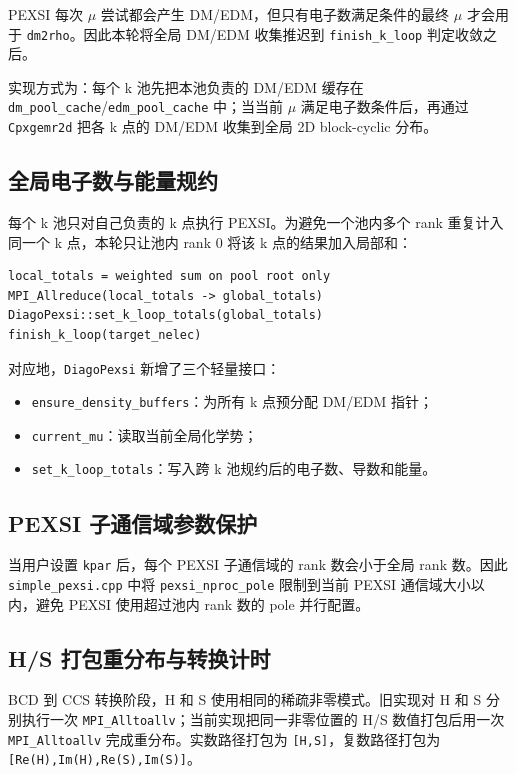 \documentclass[a4paper,11pt]{article}
\newcommand{\code}[1]{\texttt{#1}}
\begin{document}
PEXSI 每次 \(\mu\) 尝试都会产生 DM/EDM，但只有电子数满足条件的最终 \(\mu\) 才会用于 \code{dm2rho}。因此本轮将全局 DM/EDM 收集推迟到 \code{finish\_k\_loop} 判定收敛之后。

实现方式为：每个 k 池先把本池负责的 DM/EDM 缓存在 \code{dm\_pool\_cache}/\code{edm\_pool\_cache} 中；当当前 \(\mu\) 满足电子数条件后，再通过 \code{Cpxgemr2d} 把各 k 点的 DM/EDM 收集到全局 2D block-cyclic 分布。

\subsection{全局电子数与能量规约}

每个 k 池只对自己负责的 k 点执行 PEXSI。为避免一个池内多个 rank 重复计入同一个 k 点，本轮只让池内 rank 0 将该 k 点的结果加入局部和：

\begin{verbatim}
local_totals = weighted sum on pool root only
MPI_Allreduce(local_totals -> global_totals)
DiagoPexsi::set_k_loop_totals(global_totals)
finish_k_loop(target_nelec)
\end{verbatim}

对应地，\code{DiagoPexsi} 新增了三个轻量接口：

\begin{itemize}
    \item \code{ensure\_density\_buffers}：为所有 k 点预分配 DM/EDM 指针；
    \item \code{current\_mu}：读取当前全局化学势；
    \item \code{set\_k\_loop\_totals}：写入跨 k 池规约后的电子数、导数和能量。
\end{itemize}

\subsection{PEXSI 子通信域参数保护}

当用户设置 \code{kpar} 后，每个 PEXSI 子通信域的 rank 数会小于全局 rank 数。因此 \code{simple\_pexsi.cpp} 中将 \code{pexsi\_nproc\_pole} 限制到当前 PEXSI 通信域大小以内，避免 PEXSI 使用超过池内 rank 数的 pole 并行配置。

\subsection{H/S 打包重分布与转换计时}

BCD 到 CCS 转换阶段，H 和 S 使用相同的稀疏非零模式。旧实现对 H 和 S 分别执行一次 \code{MPI\_Alltoallv}；当前实现把同一非零位置的 H/S 数值打包后用一次 \code{MPI\_Alltoallv} 完成重分布。实数路径打包为 \code{[H,S]}，复数路径打包为 \code{[Re(H),Im(H),Re(S),Im(S)]}。
\end{document}
